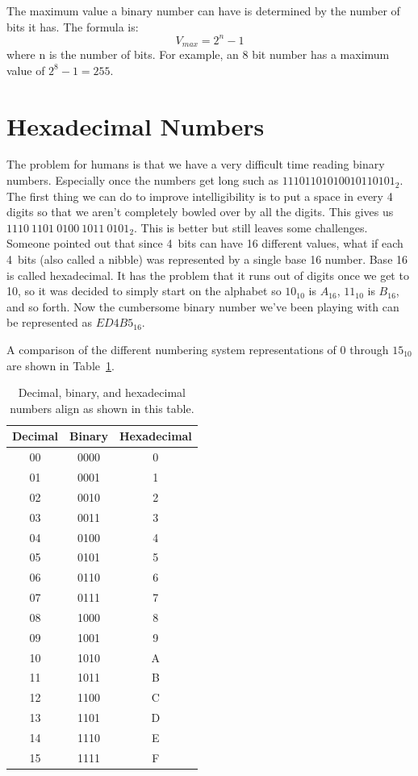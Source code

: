The maximum value a binary number can have is determined by the number of bits it has. The formula is: 
\begin{equation}
	V_{max} = 2^n - 1
\end{equation}
where n is the number of bits. For example, an 8 bit number has a maximum value of $2^8 - 1 = 255$.

\section{Hexadecimal Numbers}
\begin{sloppypar}
The problem for humans is that we have a very difficult time reading binary numbers. Especially once the
numbers get long such as $11101101010010110101_2$. The first thing we can do to improve intelligibility is to 
put a space in every 4 digits so that we aren't completely bowled over by all the digits. This gives us
$1110~1101~0100~1011~0101_2$. This is better but still leaves some challenges. Someone pointed out that since
4~bits can have 16 different values, what if each 4~bits (also called a nibble) was represented by a single
base 16 number. Base 16 is called hexadecimal. It has the problem that it runs out of digits once we get to 
10, so it was decided to simply start on the alphabet so $10_{10}$ is $A_{16}$, $11_{10}$ is $B_{16}$, and so forth. Now 
the cumbersome binary number we've been playing with can be represented as $ED4B5_{16}$. 
\end{sloppypar}

A comparison of the different numbering system representations of 0 through $15_{10}$ are shown in 
Table~\ref{table:numsystems}.

\begin{table}[!ht]
	\centering
	\begin{tabular}{c c c}
		\hline
		Decimal & Binary & Hexadecimal \\ 
		\hline
		00 & 0000 & 0 \\
		01 & 0001 & 1 \\
		02 & 0010 & 2 \\
		03 & 0011 & 3 \\
		04 & 0100 & 4 \\
		05 & 0101 & 5 \\
		06 & 0110 & 6 \\
		07 & 0111 & 7 \\
		08 & 1000 & 8 \\
		09 & 1001 & 9 \\
		10 & 1010 & A \\
		11 & 1011 & B \\
		12 & 1100 & C \\
		13 & 1101 & D \\
		14 & 1110 & E \\
		15 & 1111 & F \\
		\hline
	\end{tabular}
	\caption{Decimal, binary, and hexadecimal numbers align as shown in this table.}
	\label{table:numsystems}
\end{table}

